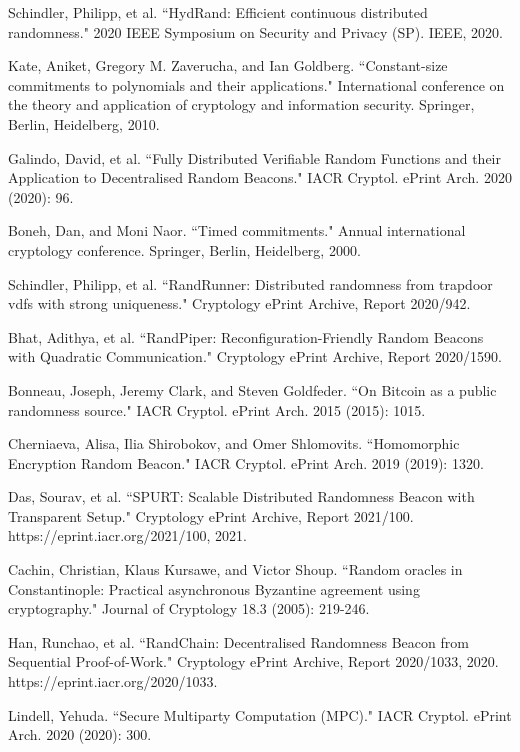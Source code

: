 \documentclass[11pt]{article}
\theoremstyle{definition}
\theoremstyle{remark}
\begin{document}
\begin{thebibliography}{100}
Schindler, Philipp, et al. ``HydRand: Efficient continuous distributed randomness." 2020 IEEE Symposium on Security and Privacy (SP). IEEE, 2020.

Kate, Aniket, Gregory M. Zaverucha, and Ian Goldberg. ``Constant-size commitments to polynomials and their applications." International conference on the theory and application of cryptology and information security. Springer, Berlin, Heidelberg, 2010.

Galindo, David, et al. ``Fully Distributed Verifiable Random Functions and their Application to Decentralised Random Beacons." IACR Cryptol. ePrint Arch. 2020 (2020): 96.

Boneh, Dan, and Moni Naor. ``Timed commitments." Annual international cryptology conference. Springer, Berlin, Heidelberg, 2000.

Schindler, Philipp, et al. ``RandRunner: Distributed randomness from trapdoor vdfs with strong uniqueness." Cryptology ePrint Archive, Report 2020/942.

Bhat, Adithya, et al. ``RandPiper: Reconfiguration-Friendly Random Beacons with Quadratic Communication." Cryptology ePrint Archive, Report 2020/1590.

Bonneau, Joseph, Jeremy Clark, and Steven Goldfeder. ``On Bitcoin as a public randomness source." IACR Cryptol. ePrint Arch. 2015 (2015): 1015.

Cherniaeva, Alisa, Ilia Shirobokov, and Omer Shlomovits. ``Homomorphic Encryption Random Beacon." IACR Cryptol. ePrint Arch. 2019 (2019): 1320.

Das, Sourav, et al. ``SPURT: Scalable Distributed Randomness Beacon with Transparent Setup." Cryptology ePrint Archive, Report 2021/100. https://eprint.iacr.org/2021/100, 2021.

Cachin, Christian, Klaus Kursawe, and Victor Shoup. ``Random oracles in Constantinople: Practical asynchronous Byzantine agreement using cryptography." Journal of Cryptology 18.3 (2005): 219-246.

Han, Runchao, et al. ``RandChain: Decentralised Randomness Beacon from Sequential Proof-of-Work." Cryptology ePrint Archive, Report 2020/1033, 2020. https://eprint.iacr.org/2020/1033.

Lindell, Yehuda. ``Secure Multiparty Computation (MPC)." IACR Cryptol. ePrint Arch. 2020 (2020): 300.


\end{thebibliography}
\end{document}
